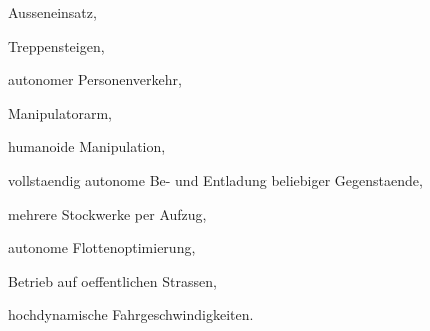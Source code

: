   \item Ausseneinsatz,
  \item Treppensteigen,
  \item autonomer Personenverkehr,
  \item Manipulatorarm,
  \item humanoide Manipulation,
  \item vollstaendig autonome Be- und Entladung beliebiger Gegenstaende,
  \item mehrere Stockwerke per Aufzug,
  \item autonome Flottenoptimierung,
  \item Betrieb auf oeffentlichen Strassen,
  \item hochdynamische Fahrgeschwindigkeiten.
